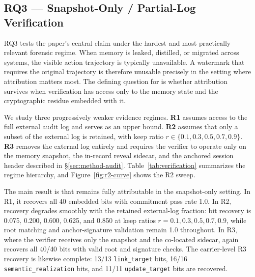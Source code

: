 


\subsection{RQ3 — Snapshot-Only / Partial-Log Verification}
\label{sec:rq3}


RQ3 tests the paper's central
claim under the hardest and most practically relevant forensic regime.
When memory is leaked, distilled, or migrated across systems, the
visible action trajectory is typically unavailable. A watermark that
requires the original trajectory is therefore unusable precisely in the
setting where attribution matters most. The defining question for
\memmark{} is whether attribution survives when verification has access
only to the memory state and the cryptographic residue embedded with
it.

We study three progressively weaker evidence regimes.
\textbf{R1} assumes access to the full external audit log and serves as
an upper bound. \textbf{R2} assumes that only a subset of the external
log is retained, with keep ratio
$r \in \{0.1, 0.3, 0.5, 0.7, 0.9\}$. \textbf{R3} removes the external log entirely and requires the verifier to
operate only on the memory snapshot, the in-record reveal sidecar, and
the anchored session header described in
\S\ref{sec:method-audit}. Table~\ref{tab:verification} summarizes the
regime hierarchy, and Figure~\ref{fig:r2-curve} shows the R2 sweep.

 

The main result is that \memmark{} remains fully attributable in the
snapshot-only setting. In R1, it recovers all 40 embedded bits with
commitment pass rate 1.0. In R2, recovery degrades smoothly with the
retained external-log fraction: bit recovery is 0.075, 0.200, 0.600,
0.625, and 0.850 at keep ratios
$r = 0.1, 0.3, 0.5, 0.7, 0.9$, while root matching and
anchor-signature validation remain 1.0 throughout. In R3, where the
verifier receives only the snapshot and the co-located sidecar,
\memmark{} again recovers all 40/40 bits with valid root and signature
checks. The carrier-level R3 recovery is likewise complete: 13/13
\texttt{link\_target} bits, 16/16
\texttt{semantic\_realization} bits, and 11/11
\texttt{update\_target} bits are recovered.

